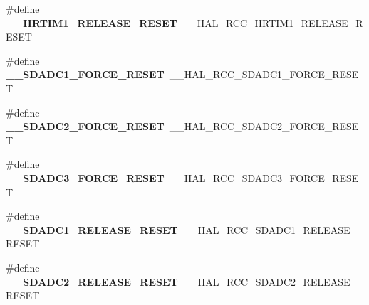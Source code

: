 \begin{DoxyCompactItemize}
\item 
\hypertarget{group___h_a_l___r_c_c___aliased_ga94826174a601c902e37f88bcee03059a}{\#define {\bfseries \-\_\-\-\_\-\-H\-R\-T\-I\-M1\-\_\-\-R\-E\-L\-E\-A\-S\-E\-\_\-\-R\-E\-S\-E\-T}~\-\_\-\-\_\-\-H\-A\-L\-\_\-\-R\-C\-C\-\_\-\-H\-R\-T\-I\-M1\-\_\-\-R\-E\-L\-E\-A\-S\-E\-\_\-\-R\-E\-S\-E\-T}\label{group___h_a_l___r_c_c___aliased_ga94826174a601c902e37f88bcee03059a}

\item 
\hypertarget{group___h_a_l___r_c_c___aliased_ga4772f1a0159530556eafe5771e89396b}{\#define {\bfseries \-\_\-\-\_\-\-S\-D\-A\-D\-C1\-\_\-\-F\-O\-R\-C\-E\-\_\-\-R\-E\-S\-E\-T}~\-\_\-\-\_\-\-H\-A\-L\-\_\-\-R\-C\-C\-\_\-\-S\-D\-A\-D\-C1\-\_\-\-F\-O\-R\-C\-E\-\_\-\-R\-E\-S\-E\-T}\label{group___h_a_l___r_c_c___aliased_ga4772f1a0159530556eafe5771e89396b}

\item 
\hypertarget{group___h_a_l___r_c_c___aliased_ga8ac8bc6474aee01e71d62b035fbf6126}{\#define {\bfseries \-\_\-\-\_\-\-S\-D\-A\-D\-C2\-\_\-\-F\-O\-R\-C\-E\-\_\-\-R\-E\-S\-E\-T}~\-\_\-\-\_\-\-H\-A\-L\-\_\-\-R\-C\-C\-\_\-\-S\-D\-A\-D\-C2\-\_\-\-F\-O\-R\-C\-E\-\_\-\-R\-E\-S\-E\-T}\label{group___h_a_l___r_c_c___aliased_ga8ac8bc6474aee01e71d62b035fbf6126}

\item 
\hypertarget{group___h_a_l___r_c_c___aliased_ga6a3f02c81f3fbd193d9d06e429824c68}{\#define {\bfseries \-\_\-\-\_\-\-S\-D\-A\-D\-C3\-\_\-\-F\-O\-R\-C\-E\-\_\-\-R\-E\-S\-E\-T}~\-\_\-\-\_\-\-H\-A\-L\-\_\-\-R\-C\-C\-\_\-\-S\-D\-A\-D\-C3\-\_\-\-F\-O\-R\-C\-E\-\_\-\-R\-E\-S\-E\-T}\label{group___h_a_l___r_c_c___aliased_ga6a3f02c81f3fbd193d9d06e429824c68}

\item 
\hypertarget{group___h_a_l___r_c_c___aliased_ga4c37af0e1de4a052f0a5a66a13369f49}{\#define {\bfseries \-\_\-\-\_\-\-S\-D\-A\-D\-C1\-\_\-\-R\-E\-L\-E\-A\-S\-E\-\_\-\-R\-E\-S\-E\-T}~\-\_\-\-\_\-\-H\-A\-L\-\_\-\-R\-C\-C\-\_\-\-S\-D\-A\-D\-C1\-\_\-\-R\-E\-L\-E\-A\-S\-E\-\_\-\-R\-E\-S\-E\-T}\label{group___h_a_l___r_c_c___aliased_ga4c37af0e1de4a052f0a5a66a13369f49}

\item 
\hypertarget{group___h_a_l___r_c_c___aliased_ga2e4a60fcdf3be6c4ce6414cd859b245c}{\#define {\bfseries \-\_\-\-\_\-\-S\-D\-A\-D\-C2\-\_\-\-R\-E\-L\-E\-A\-S\-E\-\_\-\-R\-E\-S\-E\-T}~\-\_\-\-\_\-\-H\-A\-L\-\_\-\-R\-C\-C\-\_\-\-S\-D\-A\-D\-C2\-\_\-\-R\-E\-L\-E\-A\-S\-E\-\_\-\-R\-E\-S\-E\-T}\label{group___h_a_l___r_c_c___aliased_ga2e4a60fcdf3be6c4ce6414cd859b245c}


\end{DoxyCompactItemize}
